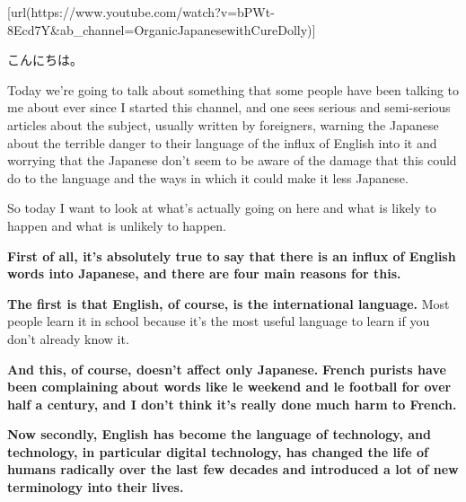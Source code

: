 \startsectionlevel[title={{\bf 92. Will English EAT Japanese? Loan-word invasion - is it really a threat?}},reference={will-english-eat-japanese-loan-word-invasion---is-it-really-a-threat}]

[url(https://www.youtube.com/watch?v=bPWt-8Ecd7Y&ab_channel=OrganicJapanesewithCureDolly)]

こんにちは。

Today we're going to talk about something that some people have been talking to me about ever since I started this channel, and one sees serious and semi-serious articles about the subject, usually written by foreigners, warning the Japanese about the terrible danger to their language of the influx of English into it and worrying that the Japanese don't seem to be aware of the damage that this could do to the language and the ways in which it could make it less Japanese.

{}

So today I want to look at what's actually going on here and what is likely to happen and what is unlikely to happen.

\startsectionlevel[title={Reasons so many English words exist in Modern Japanese},reference={reasons-so-many-english-words-exist-in-modern-japanese}]

{\bf First of all, it's absolutely true to say that there is an influx of English words into Japanese, and there are four main reasons for this.}

\thinrule

{\bf The first is that English, of course, is the international language.} Most people learn it in school because it's the most useful language to learn if you don't already know it.

{}

{\bf And this, of course, doesn't affect only Japanese.} {\bf French purists have been complaining about words like le weekend and le football for over half a century, and I don't think it's really done much harm to French.}

\thinrule

{\bf Now secondly, English has become the language of technology, and technology, in particular digital technology, has changed the life of humans radically over the last few decades and introduced a lot of new terminology into their lives.}

{}

